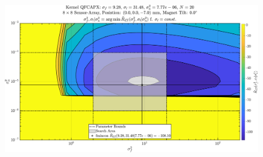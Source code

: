 \documentclass{beamer}
\begin{document}
\begin{frame}
\begin{figure}
\includegraphics[width=\linewidth]{images/Noise_vs_Variance}
\end{figure}
\end{frame}
\end{document}
